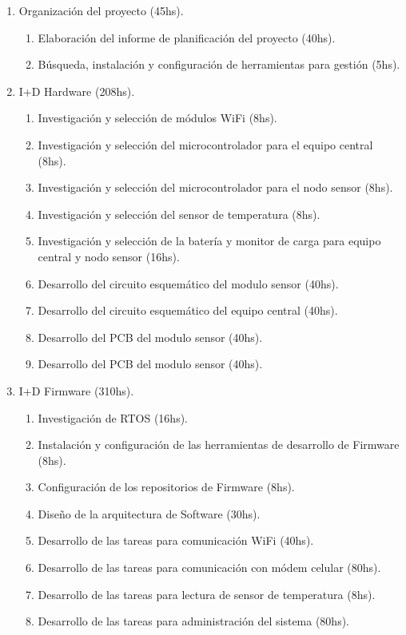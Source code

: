\documentclass[11pt]{charter}
\begin{document}
\begin{enumerate}
\item Organización del proyecto (45hs).
	\begin{enumerate}
	\item Elaboración del informe de planificación del proyecto (40hs).
	\item Búsqueda, instalación y configuración de herramientas para gestión (5hs).
	\end{enumerate}
\item I+D Hardware (208hs).
	\begin{enumerate}
	\item Investigación y selección de módulos WiFi (8hs).
	\item Investigación y selección del microcontrolador para el equipo central (8hs).
	\item Investigación y selección del microcontrolador para el nodo sensor (8hs).
	\item Investigación y selección del sensor de temperatura (8hs).
	\item Investigación y selección de la batería y monitor de carga para equipo central y nodo sensor (16hs).
	\item Desarrollo del circuito esquemático del modulo sensor (40hs).
	\item Desarrollo del circuito esquemático del equipo central (40hs).
	\item Desarrollo del PCB del modulo sensor (40hs).
	\item Desarrollo del PCB del modulo sensor (40hs).
	\end{enumerate}
\item I+D Firmware (310hs).
	\begin{enumerate}
	\item Investigación de RTOS (16hs).
	\item Instalación y configuración de las herramientas de desarrollo de Firmware (8hs).
	\item Configuración de los repositorios de Firmware (8hs).
	\item Diseño de la arquitectura de Software (30hs).
	\item Desarrollo de las tareas para comunicación WiFi (40hs).
	\item Desarrollo de las tareas para comunicación con módem celular (80hs).
	\item Desarrollo de las tareas para lectura de sensor de temperatura (8hs).
	\item Desarrollo de las tareas para administración del sistema (80hs).

\end{enumerate}
\end{enumerate}
\end{document}
